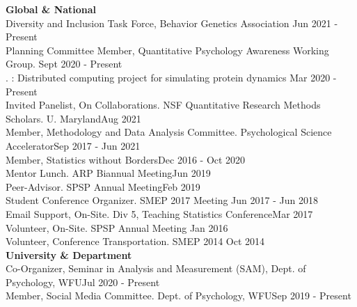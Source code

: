 {\large \textbf{Global \& National}}\smallskip\\
Diversity and Inclusion Task Force, Behavior Genetics Association \hfill{Jun 2021 - Present}\smallskip\\
Planning Committee Member, Quantitative Psychology Awareness Working Group. \hfill{Sept 2020 - Present}\smallskip\\%
. : Distributed computing project for simulating protein dynamics \hfill{Mar 2020 - Present}\smallskip\\
%
Invited Panelist, {\small On Collaborations. NSF Quantitative Research Methods Scholars. U. Maryland}\hfill{Aug 2021}\smallskip\\
Member, Methodology and Data Analysis Committee. Psychological Science Accelerator\hfill{Sep 2017 - Jun 2021}\smallskip\\
Member, Statistics without Borders\hfill{Dec 2016 - Oct 2020}\smallskip\\
%
Mentor Lunch. ARP Biannual Meeting\hfill{Jun 2019}\smallskip\\
Peer-Advisor. SPSP Annual Meeting\hfill{Feb 2019}\smallskip\\
Student Conference Organizer. SMEP 2017 Meeting \hfill{Jun 2017 - Jun 2018}\smallskip\\
Email Support, On-Site. Div 5, Teaching Statistics Conference\hfill{Mar 2017}\smallskip\\
Volunteer, On-Site. SPSP Annual Meeting \hfill{Jan 2016}\smallskip\\
Volunteer, Conference Transportation. SMEP 2014  \hfill{Oct 2014}\medskip\\
%
%
{\large \textbf{University \& Department}}\smallskip\\
Co-Organizer, Seminar in Analysis and Measurement (SAM), Dept. of Psychology, WFU\hfill {Jul 2020 - Present}\smallskip\\
Member, Social Media Committee. Dept. of Psychology, WFU\hfill {Sep 2019 - Present}\smallskip\\
